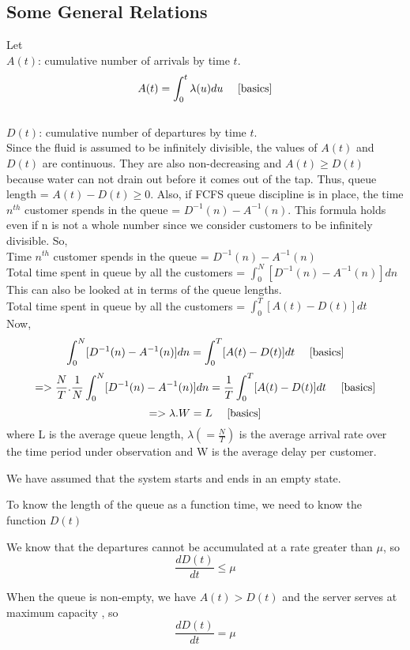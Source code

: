 \subsection{Some General Relations}
Let \\
$A(t)$: cumulative number of arrivals by
time $t$. 
\[A(t) = \int_{0}^{t} \lambda(u) du \ \ \ \ \cite{basics}\]
\\
$D(t)$: cumulative number of departures by
time $t$. \\
Since the fluid is assumed to be infinitely divisible, the values of $A(t)$ and $D(t)$ are continuous. They are also non-decreasing and $A(t) \geq D(t)$ because water can not drain out before it comes out of the tap. Thus, queue length = $A(t) - D(t) \geq 0$. Also, if FCFS queue discipline is in place, the time $n^{th}$ customer spends in the queue = $D^{-1}(n) - A^{-1}(n)$. This formula holds even if n is not a whole number since we consider customers to be infinitely divisible. So,\\
Time $n^{th}$ customer spends in the queue = $D^{-1}(n) - A^{-1}(n)$ \cite{basics}\\
Total time spent in queue by all the customers = $\int_{0}^{N} [D^{-1}(n) - A^{-1}(n)] dn$ \cite{basics}\\
This can also be looked at in terms of the queue lengths. \\
Total time spent in queue by all the customers = $\int_{0}^{T} [A(t) - D(t)] dt$ \cite{basics}\\
Now, \\
\[\int_{0}^{N} [D^{-1}(n) - A^{-1}(n)] dn = \int_{0}^{T} [A(t) - D(t)] dt \ \ \ \ \cite{basics}\]
\[=>\frac{N}{T}.\frac{1}{N}\int_{0}^{N} [D^{-1}(n) - A^{-1}(n)] dn = \frac{1}{T}\int_{0}^{T} [A(t) - D(t)] dt \ \ \ \ \cite{basics}\]
\[=>\lambda.W = L\ \ \ \ \cite{basics}\]
where L is the average queue length,  $\lambda(=\frac{N}{T})$ is the average arrival rate over
the time period under observation and W is the average delay per customer. 
\begin{remark}
We have assumed that the system starts and ends in an empty state.
\end{remark}
To know the length of the queue as a function time, we need to know the function $D(t)$
 \begin{remark}
 We know that the departures cannot be accumulated at a rate greater than $\mu$, so $$\frac{dD(t)}{dt} \leq \mu$$
 \end{remark} 
 \begin{remark}
 When the queue is non-empty, we have $A(t)>D(t)$ and the server serves at maximum capacity , so $$\frac{dD(t)}{dt} = \mu$$ 
 \end{remark}
